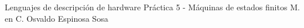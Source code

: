 




	\pnormal
	{Lenguajes de descripción de hardware}
	{Práctica 5  - Máquinas de estados finitos}
	{M. en C. Osvaldo Espinosa Sosa}
	\tableofcontents
	
	\newpage 
	\clearpage 



